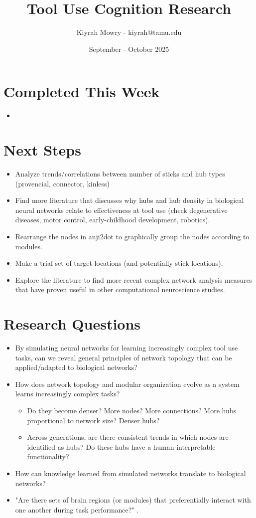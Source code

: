 \documentclass{article}
\title{Tool Use Cognition Research}
\author{Kiyrah Mowry - kiyrah@tamu.edu}
\date{September - October 2025}
\begin{document}
\maketitle
\section{Completed This Week}
\begin{itemize}
    \item
\end{itemize}

\section{Next Steps}
\begin{itemize}  
    \item Analyze trends/correlations between number of sticks and hub types (provencial, connector, kinless)
    \item Find more literature that discusses why hubs and hub density in biological neural networks relate to effectiveness at tool use (check degenerative diseases, motor control, early-childhood development, robotics).
    \item Rearrange the nodes in anji2dot to graphically group the nodes according to modules.
    \item Make a trial set of target locations (and potentially stick locations).
    \item Explore the literature to find more recent complex network analysis measures that have proven useful in other computational neuroscience studies.
\end{itemize}
\newpage

\section{Research Questions}
\begin{itemize}
    \item By simulating neural networks for learning increasingly complex tool use tasks, can we reveal general principles of network topology that can be applied/adapted to biological networks?
    \item How does network topology and modular organization evolve as a system learns increasingly complex tasks?
    \begin{itemize}
        \item Do they become denser? More nodes? More connections? More hubs proportional to network size? Denser hubs?
        \item Across generations, are there consistent trends in which nodes are identified as hubs? Do these hubs have a human-interpretable functionality?
    \end{itemize}
    \item How can knowledge learned from simulated networks translate to biological networks?
    \item "Are there sets of brain regions (or modules) that preferentially interact with one another during task performance?" \cite{bassett_learning-induced_2015}.
\end{itemize}
\end{document}
